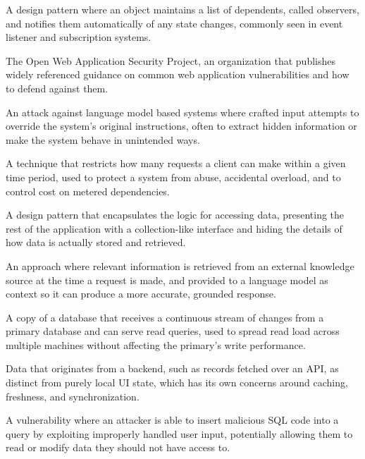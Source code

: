 \documentclass[11pt,a4paper]{report}
\begin{document}
\begin{description}[leftmargin=*,style=nextline]
\item[Observer Pattern] A design pattern where an object maintains a list of dependents, called observers, and notifies them automatically of any state changes, commonly seen in event listener and subscription systems.

\item[OWASP] The Open Web Application Security Project, an organization that publishes widely referenced guidance on common web application vulnerabilities and how to defend against them.

\item[Prompt Injection] An attack against language model based systems where crafted input attempts to override the system's original instructions, often to extract hidden information or make the system behave in unintended ways.

\item[Rate Limiting] A technique that restricts how many requests a client can make within a given time period, used to protect a system from abuse, accidental overload, and to control cost on metered dependencies.

\item[Repository Pattern] A design pattern that encapsulates the logic for accessing data, presenting the rest of the application with a collection-like interface and hiding the details of how data is actually stored and retrieved.

\item[Retrieval Augmented Generation (RAG)] An approach where relevant information is retrieved from an external knowledge source at the time a request is made, and provided to a language model as context so it can produce a more accurate, grounded response.

\item[Read Replica] A copy of a database that receives a continuous stream of changes from a primary database and can serve read queries, used to spread read load across multiple machines without affecting the primary's write performance.

\item[Server State] Data that originates from a backend, such as records fetched over an API, as distinct from purely local UI state, which has its own concerns around caching, freshness, and synchronization.

\item[SQL Injection] A vulnerability where an attacker is able to insert malicious SQL code into a query by exploiting improperly handled user input, potentially allowing them to read or modify data they should not have access to.


\end{description}
\end{document}
